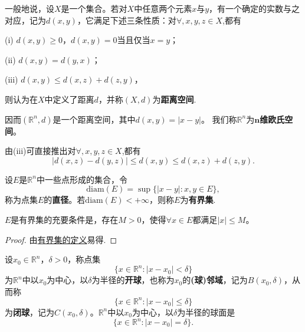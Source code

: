 \documentclass[../../main.tex]{subfiles}
\begin{document}
\begin{definition}[距离空间]\label{definition:距离空间}
一般地说，设\(X\)是一个集合。若对\(X\)中任意两个元素\(x\)与\(y\)，有一个确定的实数与之对应，记为\(d(x,y)\)，它满足下述三条性质：对$\forall,x,y,z\in X$,都有

(i) \(d(x,y)\geqslant0\)，\(d(x,y)=0\)当且仅当\(x = y\)；

(ii) \(d(x,y)=d(y,x)\)；

(iii) \(d(x,y)\leqslant d(x,z)+d(z,y)\)，

则认为在\(X\)中定义了距离\(d\)，并称\((X,d)\)为\textbf{距离空间}.
\end{definition}
\begin{note}
因而\((\mathbb{R}^n,d)\)是一个距离空间，其中\(d(x,y)=|x - y|\)。
我们称\(\mathbb{R}^n\)为\textbf{\(\boldsymbol{n}\)维欧氏空间}。
\end{note}
\begin{remark}
由(iii)可直接推出对$\forall,x,y,z\in X$,都有
\[
|d(x,z)-d(y,z)|\leqslant d(x,y)\leqslant d(x,z)+d(z,y).
\]
\end{remark}

\begin{definition}[点集的直径与有界集]\label{definition:点集的直径与有界集}
设\(E\)是\(\mathbb{R}^n\)中一些点形成的集合，令
\[\text{diam}(E)=\sup\{|x - y|:x,y\in E\},\]
称为点集\(E\)的\textbf{直径}。若\(\text{diam}(E)<+\infty\)，则称\(E\)为\textbf{有界集}.
\end{definition}

\begin{proposition}[有界集的充要条件]\label{proposition:有界集的充要条件}
  \(E\)是有界集的充要条件是，存在\(M > 0\)，使得\(\forall x\in E\)都满足\(|x|\leqslant M\)。
\end{proposition}
\begin{proof}
  由\hyperref[definition:点集的直径与有界集]{有界集的定义}易得.
\end{proof}

\begin{definition}[点的(球)邻域]\label{definition:点的(球)邻域}
  设\(x_0\in\mathbb{R}^n\)，\(\delta>0\)，称点集
\[\{x\in\mathbb{R}^n:|x - x_0|<\delta\}\]
为\(\mathbb{R}^n\)中以\(x_0\)为中心，以\(\delta\)为半径的\textbf{开球}，也称为\(x_0\)的\textbf{(球)邻域}，记为\(B(x_0,\delta)\)，从而称
\[\{x\in\mathbb{R}^n:|x - x_0|\leqslant\delta\}\]
为\textbf{闭球}，记为\(C(x_0,\delta)\)。\(\mathbb{R}^n\)中以\(x_0\)为中心，以\(\delta\)为半径的球面是
\[\{x\in\mathbb{R}^n:|x - x_0|=\delta\}.\]
\end{definition}
\end{document}
